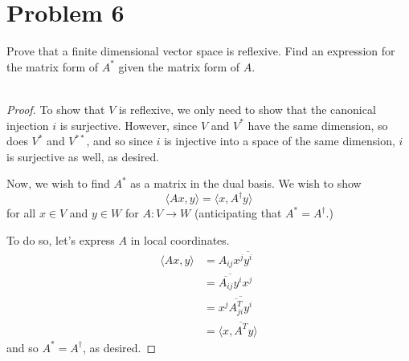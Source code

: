 \documentclass[fontsize=11pt]{scrartcl} %
\numberwithin{equation}{section} %
\numberwithin{figure}{section} %
\numberwithin{table}{section} %
\begin{document}
\section*{Problem 6}
Prove that a finite dimensional vector space is reflexive. Find an expression
for the matrix form of $A^*$ given the matrix form of $A$.
\\
\\
\begin{proof}
    To show that $V$ is reflexive, we only need to show that the canonical
    injection $i$ is surjective. However, since $V$ and $V^*$ have the same
    dimension, so does $V^*$ and $V^{**}$, and so since $i$ is injective into a
    space of the same dimension, $i$ is surjective as well, as desired.

    Now, we wish to find $A^*$ as a matrix in the dual basis. We wish to show
    \[
        \langle Ax,y\rangle = \langle x,A^{\dagger}y\rangle
    \]
    for all $x\in V$ and $y\in W$ for $A:V\to W$ (anticipating that $A^* =
    A^{\dagger}$.)

    To do so, let's express $A$ in local coordinates.
    \[
        \begin{aligned}
            \langle Ax,y\rangle &= A_{ij}x^j\overline{y^i}\\
            &= \overline{\overline{A_{ij}}y^i}x^j\\
            &= x^j\overline{\overline{A_{ji}^T}y^i}\\
            &= \langle x, \overline{A^T}y\rangle
        \end{aligned}
    \]
    and so $A^* = A^{\dagger}$, as desired.
\end{proof}
\end{document}
